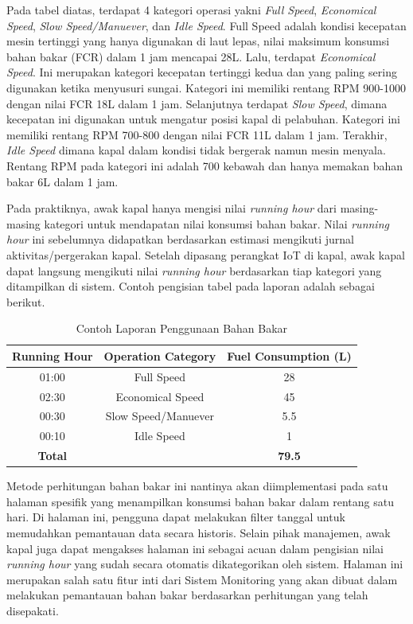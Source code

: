 Pada tabel diatas, terdapat 4 kategori operasi yakni \textit{Full Speed}, \textit{Economical Speed}, \textit{Slow Speed/Manuever}, dan \textit{Idle Speed}. Full Speed adalah kondisi kecepatan mesin tertinggi yang hanya digunakan di laut lepas, nilai maksimum konsumsi bahan bakar (FCR) dalam 1 jam mencapai 28L. Lalu, terdapat \textit{Economical Speed}. Ini merupakan kategori kecepatan tertinggi kedua dan yang paling sering digunakan ketika menyusuri sungai. Kategori ini memiliki rentang RPM 900-1000 dengan nilai FCR 18L dalam 1 jam. Selanjutnya terdapat \textit{Slow Speed}, dimana kecepatan ini digunakan untuk mengatur posisi kapal di pelabuhan. Kategori ini memiliki rentang RPM 700-800 dengan nilai FCR 11L dalam 1 jam. Terakhir, \textit{Idle Speed} dimana kapal dalam kondisi tidak bergerak namun mesin menyala. Rentang RPM pada kategori ini adalah 700 kebawah dan hanya memakan bahan bakar 6L dalam 1 jam.

Pada praktiknya, awak kapal hanya mengisi nilai \textit{running hour} dari masing-masing kategori untuk mendapatan nilai konsumsi bahan bakar. Nilai \textit{running hour} ini sebelumnya didapatkan berdasarkan estimasi mengikuti jurnal aktivitas/pergerakan kapal. Setelah dipasang perangkat IoT di kapal, awak kapal dapat langsung mengikuti nilai \textit{running hour} berdasarkan tiap kategori yang ditampilkan di sistem. Contoh pengisian tabel pada laporan adalah sebagai berikut.


\begin{table}[!h]
    \caption{Contoh Laporan Penggunaan Bahan Bakar}
    \centering
     \begin{tabular}{c c c}
        \toprule
        Running Hour &
        Operation Category &
        Fuel Consumption (L) \\ [0.5ex]
        \midrule
        01:00   & Full Speed            & 28    \\
        02:30   & Economical Speed      & 45    \\
        00:30   & Slow Speed/Manuever   & 5.5   \\
        00:10   & Idle Speed            & 1     \\
        \textbf{Total}   &              & \textbf{79.5}     \\ [1ex]
        \bottomrule
     \end{tabular}
     \label{tab:fc-report-example}
\end{table}

Metode perhitungan bahan bakar ini nantinya akan diimplementasi pada satu halaman spesifik yang menampilkan konsumsi bahan bakar dalam rentang satu hari. Di halaman ini, pengguna dapat melakukan filter tanggal untuk memudahkan pemantauan data secara historis. Selain pihak manajemen, awak kapal juga dapat mengakses halaman ini sebagai acuan dalam pengisian nilai \textit{running hour} yang sudah secara otomatis dikategorikan oleh sistem. Halaman ini merupakan salah satu fitur inti dari Sistem Monitoring yang akan dibuat dalam melakukan pemantauan bahan bakar berdasarkan perhitungan yang telah disepakati.

